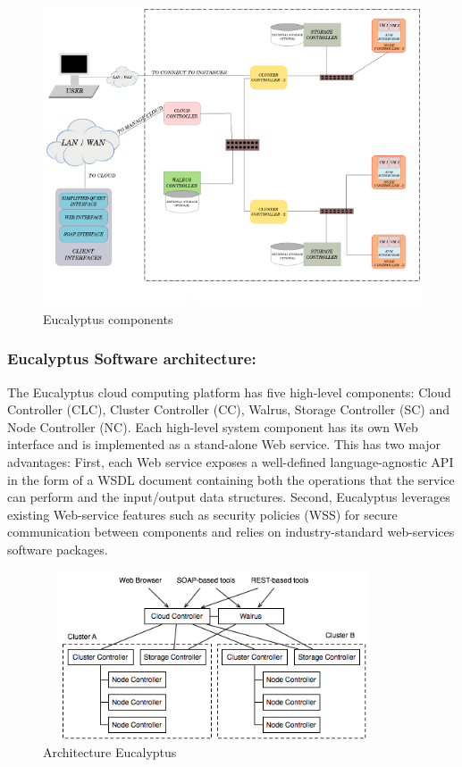 \begin{figure}[!h]
 \center
 \includegraphics[width=12cm, height=9cm]{./images/ComponentsEucalyptus.png}
 \caption{Eucalyptus components}
\end{figure}



\subsubsection{Eucalyptus Software architecture:}


The Eucalyptus cloud computing platform has five high-level components: 
Cloud Controller (CLC), Cluster Controller (CC), Walrus, Storage Controller (SC) and Node Controller (NC).
 Each high-level system component has its own Web interface and is implemented as a stand-alone Web service. 
This has two major advantages: 
First, each Web service exposes a well-defined language-agnostic API in the form of a WSDL 
document containing both the operations that the service can perform and the input/output data structures.
Second, Eucalyptus leverages existing Web-service features such as security policies (WSS) for secure communication between components 
and relies on industry-standard web-services software packages.

\begin{figure}[!h]
 \center
 \includegraphics[width=10cm, height=5cm]{./images/EucalyptusArchitecture.png}
 \caption{Architecture Eucalyptus}
\end{figure}




